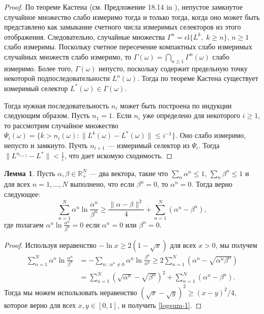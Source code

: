 \documentclass[a4paper,12pt,russian]{article} %
\theoremstyle{definition}
\newtheorem{lemma}{Лемма}
\newcommand{\R}{\mathbb{R}}
\begin{document}
\begin{proof}
По теореме Кастена (см. Предложение 18.14 in \cite{Aliprantis2006}), непустое замкнутое случайное множество слабо измеримо тогда и только тогда, когда оно может быть представлено как замыкание счетного числа измеримых селекторов из этого отображения.
Следовательно, случайные множества $\Gamma^n = \mathrm{cl}\{L^k,\; k\ge n\}$, $n\ge1$ слабо измеримы.
Поскольку счетное пересечение компактных слабо измеримых случайных множеств слабо измеримо, то $\Gamma(\omega) = \bigcap_{n\ge 1}\Gamma^n(\omega)$ слабо измеримо.
Более того, $\Gamma(\omega)$ непусто, поскольку содержит предельную точку некоторой подпоследовательности $L^n(\omega)$.
Тогда по теореме Кастена существует измеримый селектор $L^*(\omega) \in \Gamma(\omega)$.

Тогда нужная последовательность $n_i$ может быть построена по индукции следующим образом.
Пусть $n_1=1$.
Если $n_i$ уже определено для некоторого $i\ge 1$, то рассмотрим случайное множество $\Psi_i(\omega) = \{k> n_i(\omega) : \|L^k(\omega) - L^*(\omega)\| \le i^{-1}\}$. Оно слабо измеримо, непусто и замкнуто.
Пучть $n_{i+1}$ — измеримый селектор из $\Psi_i$.
Тогда $\|L^{n_{i+1}} - L^*\| < \frac{1}{i}$, что дает искомую сходимость.
\end{proof}




\begin{lemma}
\label{lemma3-logsum}
Пусть $\alpha,\beta\in\R_+^N$ — два вектора, такие что
$\sum_n \alpha^n \le 1$, $\sum_n \beta^n \le 1$ и для всех $n=1,\ldots,N$ выполнено, что если $\beta^n=0$, то $\alpha^n=0$. Тогда верно следующее:
\begin{equation}
\sum_{n=1}^N\alpha^n \ln\frac{\alpha^n}{\beta^n} \ge
\frac{\|\alpha-\beta\|^2}{4} + \sum_{n=1}^N (\alpha^n-\beta^n),\label{logsum-1}
\end{equation}
где полагаем $\alpha^n \ln\frac{\alpha^n}{\beta^n} = 0$ если $\alpha^n=0$ или $\beta^n=0$.
\end{lemma}

\begin{proof}
Используя неравенство $-\ln x \ge 2(1-\sqrt x)$ для всех $x>0$, мы получем
\[
\begin{split}
\sum_{n=1}^N \alpha^n \ln\frac{\alpha^n}{\beta^n} &= -\sum_{n\,:\,\alpha^n\neq 0}\alpha^n\ln\frac{\beta^n}{\alpha^n} \ge
2\sum_{n=1}^N (\alpha^n-\sqrt{\alpha^n\beta^n}) \\&= \sum_{n=1}^N(\sqrt{\alpha^n} -
\sqrt{\beta^n})^2 + \sum_{n=1}^N (\alpha^n - \beta^n).
\end{split}
\]
Тогда мы можем использовать неравенство $(\sqrt x - \sqrt y)^2 \ge (x-y)^2/4$, которое верно для всех $x,y\in[0,1]$, и получить \eqref{logsum-1}. 
\end{proof}
\end{document}
